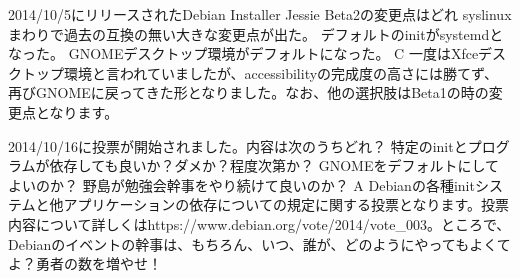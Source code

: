 \santaku
{2014/10/5にリリースされたDebian Installer Jessie Beta2の変更点はどれ}
{syslinuxまわりで過去の互換の無い大きな変更点が出た。}
{デフォルトのinitがsystemdとなった。}
{GNOMEデスクトップ環境がデフォルトになった。}
{C}
{一度はXfceデスクトップ環境と言われていましたが、accessibilityの完成度の高さには勝てず、再びGNOMEに戻ってきた形となりました。なお、他の選択肢はBeta1の時の変更点となります。}

\santaku
{2014/10/16に投票が開始されました。内容は次のうちどれ？}
{特定のinitとプログラムが依存しても良いか？ダメか？程度次第か？}
{GNOMEをデフォルトにしてよいのか？}
{野島が勉強会幹事をやり続けて良いのか？}
{A}
{Debianの各種initシステムと他アプリケーションの依存についての規定に関する投票となります。投票内容について詳しくはhttps://www.debian.org/vote/2014/vote\_003。ところで、Debianのイベントの幹事は、もちろん、いつ、誰が、どのようにやってもよくてよ？勇者の数を増やせ！}









